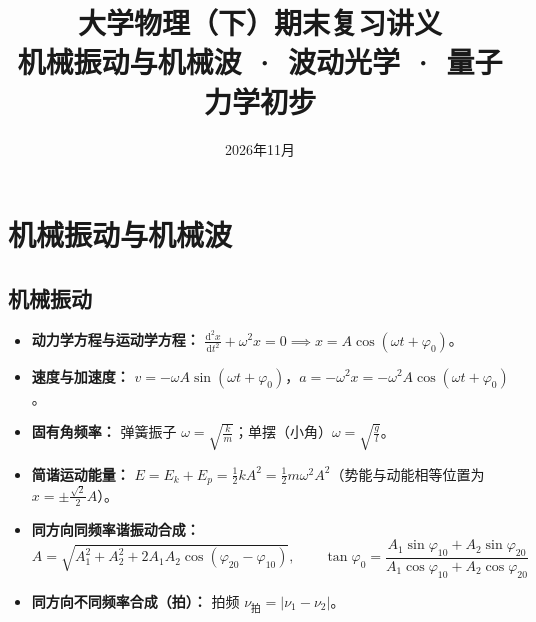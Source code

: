 \documentclass[zihao=5,a4paper,UTF8]{ctexart}
\title{\vspace{-1cm}\textbf{\Huge\color{navy} 大学物理（下）期末复习讲义}\\[0.4em]
\large\color{tealaccent} 机械振动与机械波 · 波动光学 · 量子力学初步}
\author{}
\date{2026年11月}
\newcommand{\dd}{\mathrm{d}}
\begin{document}
\maketitle
\thispagestyle{empty}

\begin{center}
\end{center}

\tableofcontents
\vspace{0.5em}

\section{机械振动与机械波}

\subsection{机械振动}

\begin{formulabox}[简谐运动与振动合成核心公式]
\begin{itemize}
    \item \textbf{动力学方程与运动学方程：} $\frac{\dd^2 x}{\dd t^2} + \omega^2 x = 0 \implies x = A\cos(\omega t + \varphi_0)$。
    \item \textbf{速度与加速度：} $v = -\omega A\sin(\omega t + \varphi_0)$，$a = -\omega^2 x = -\omega^2 A\cos(\omega t + \varphi_0)$。
    \item \textbf{固有角频率：} 弹簧振子 $\omega = \sqrt{\frac{k}{m}}$；单摆（小角）$\omega = \sqrt{\frac{g}{l}}$。
    \item \textbf{简谐运动能量：} $E = E_k + E_p = \frac{1}{2}kA^2 = \frac{1}{2}m\omega^2 A^2$（势能与动能相等位置为 $x = \pm\frac{\sqrt{2}}{2}A$）。
    \item \textbf{同方向同频率谐振动合成：}
    \[
        A = \sqrt{A_1^2 + A_2^2 + 2A_1 A_2\cos(\varphi_{20} - \varphi_{10})}, \qquad \tan\varphi_0 = \frac{A_1\sin\varphi_{10} + A_2\sin\varphi_{20}}{A_1\cos\varphi_{10} + A_2\cos\varphi_{20}}
    \]
    \item \textbf{同方向不同频率合成（拍）：} 拍频 $\nu_{\text{拍}} = |\nu_1 - \nu_2|$。
\end{itemize}
\end{formulabox}
\end{document}
